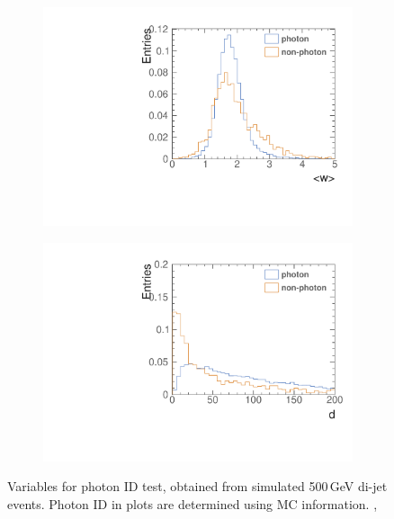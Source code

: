 \begin{figure}[tbph]
\begin{subfigure}[b]{0.45\textwidth}
    \caption{}
    \label{fig:photonLongProfileDiscrepancy}
  \end{subfigure}
  \begin{subfigure}[b]{0.45\textwidth}
    \includegraphics[width=\textwidth]{photon/likelihood/PeakRms.pdf}
    \caption{}
    \label{fig:photonPeakRms}
  \end{subfigure}
  \begin{subfigure}[b]{0.45\textwidth}
    \includegraphics[width=\textwidth]{photon/likelihood/MinDistanceToTrack.pdf}
    \caption{}
    \label{fig:photonMinDistanceToTrack}
  \end{subfigure}
\caption
{Variables for photon ID test, obtained from simulated 500\,GeV di-jet \Zuds events. Photon ID in plots are determined using MC information. , }
\label{fig:photonVarLikelihood}
\end{figure}

